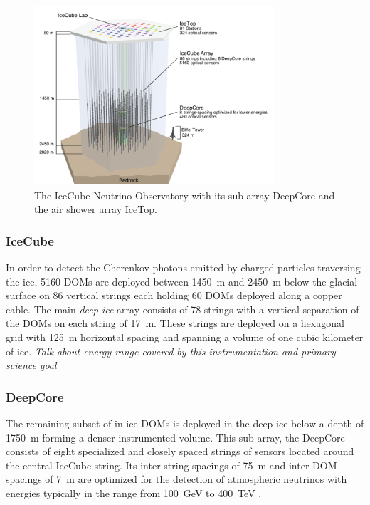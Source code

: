\begin{figure}[!h]
 \centering
 \includegraphics[width=0.8\textwidth]{graphics/intro/ArrayWSeasonsLabels_crop.pdf}
 \caption{The IceCube Neutrino Observatory with its sub-array DeepCore and the air shower array IceTop.}
 \label{fig:array}
\end{figure}


\subsubsection{IceCube}
In order to detect the Cherenkov photons emitted by charged particles traversing the ice, \num{5160} DOMs are deployed between \SI{1450}{\meter} and \SI{2450}
{\meter} below the glacial surface on \num{86} vertical strings each holding \num{60} DOMs deployed along a copper cable. The main \textit{deep-ice} array consists of \num{78} strings with a vertical separation of the DOMs on each string of \SI{17}{\meter}. These strings are deployed on a hexagonal grid with \SI{125}{\meter} horizontal spacing and spanning a volume of one cubic kilometer of ice. 
\textit{Talk about energy range covered by this instrumentation and primary science goal}

\subsubsection{DeepCore}

The remaining subset of in-ice DOMs is deployed in the deep ice below a depth of \SI{1750}{\meter} forming a denser instrumented volume. This sub-array, the DeepCore \cite{ICECUBE:DC} consists of eight specialized and closely spaced strings of sensors located around the central IceCube string.
Its inter-string spacings of \SI{75}{\meter} and inter-DOM spacings of \SI{7}{\meter} are optimized for the detection of atmospheric neutrinos with energies typically in the range from \SI{100}{\giga\electronvolt} to \SI{400}{\tera\electronvolt} \cite{ICECUBE:AtmNu}.

